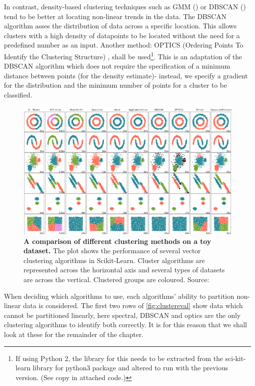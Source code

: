 In contrast, density-based clustering techniques such as GMM (\citep{scikit}) or DBSCAN (\citep{DBSCAN}) tend to be better at locating non-linear trends in the data. The DBSCAN algorithm asses the distribution of data across a specific location. This allows clusters with a high density of datapoints to be located without the need for a predefined number as an input. Another method: OPTICS (Ordering Points To Identify the Clustering Structure) \citep{optics}, shall be used\footnote{ If using Python 2, the library for this needs to be extracted from the sci-kit-learn library for python3 package and altered to run with the previous version. (See copy in attached code.)}. This is an adaptation of the DBSCAN algorithm which does not require the specification of a minimum distance between points (for the density estimate)- instead, we specify a gradient for the distribution and the minimum number of points for a cluster to be classified.


\begin{figure}[H]
     \centering

         \includegraphics[width=\textwidth]{4fig/clustereval.png}

        \caption{\textbf{A comparison of different clustering methods on a toy dataset.} The plot shows the performance of several vector clustering algorithms in Scikit-Learn. Cluster algorithms are represented across the horizontal axis and several types of datasets are across the vertical. Clustered groups are coloured. Source: \citep{clustereval}}
        \label{fig:clustereval}
\end{figure}


When deciding which algorithms to use, each algorithms' ability to partition non-linear data is considered.
The first two rows of \autoref{fig:clustereval} show data which cannot be partitioned linearly, here spectral, DBSCAN and optics are the only clustering algorithms to identify both correctly. It is for this reason that we shall look at these for the remainder of the chapter.

